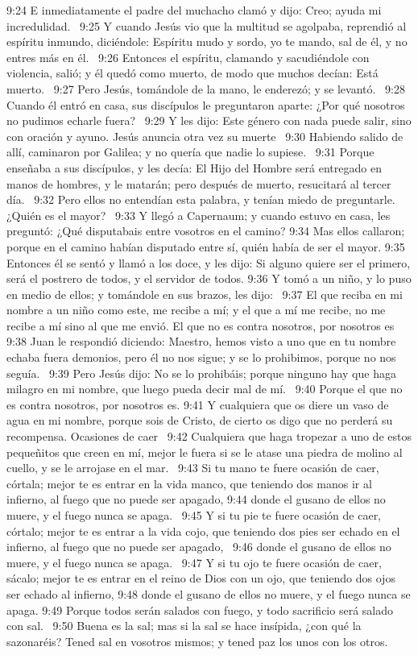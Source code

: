 9:24 E inmediatamente el padre del muchacho clamó y dijo: Creo; ayuda mi incredulidad.  
9:25 Y cuando Jesús vio que la multitud se agolpaba, reprendió al espíritu inmundo, diciéndole: Espíritu mudo y sordo, yo te mando, sal de él, y no entres más en él.  
9:26 Entonces el espíritu, clamando y sacudiéndole con violencia, salió; y él quedó como muerto, de modo que muchos decían: Está muerto.  
9:27 Pero Jesús, tomándole de la mano, le enderezó; y se levantó.  
9:28 Cuando él entró en casa, sus discípulos le preguntaron aparte: ¿Por qué nosotros no pudimos echarle fuera?  
9:29 Y les dijo: Este género con nada puede salir, sino con oración y ayuno. 
Jesús anuncia otra vez su muerte   
9:30 Habiendo salido de allí, caminaron por Galilea; y no quería que nadie lo supiese.  
9:31 Porque enseñaba a sus discípulos, y les decía: El Hijo del Hombre será entregado en manos de hombres, y le matarán; pero después de muerto, resucitará al tercer día.  
9:32 Pero ellos no entendían esta palabra, y tenían miedo de preguntarle.  
¿Quién es el mayor?   
9:33 Y llegó a Capernaum; y cuando estuvo en casa, les preguntó: ¿Qué disputabais entre vosotros en el camino? 
9:34 Mas ellos callaron; porque en el camino habían disputado entre sí, quién había de ser el mayor. 
9:35 Entonces él se sentó y llamó a los doce, y les dijo: Si alguno quiere ser el primero, será el postrero de todos, y el servidor de todos. 
9:36 Y tomó a un niño, y lo puso en medio de ellos; y tomándole en sus brazos, les dijo:  
9:37 El que reciba en mi nombre a un niño como este, me recibe a mí; y el que a mí me recibe, no me recibe a mí sino al que me envió. 
El que no es contra nosotros, por nosotros es   
9:38 Juan le respondió diciendo: Maestro, hemos visto a uno que en tu nombre echaba fuera demonios, pero él no nos sigue; y se lo prohibimos, porque no nos seguía.  
9:39 Pero Jesús dijo: No se lo prohibáis; porque ninguno hay que haga milagro en mi nombre, que luego pueda decir mal de mí.  
9:40 Porque el que no es contra nosotros, por nosotros es. 
9:41 Y cualquiera que os diere un vaso de agua en mi nombre, porque sois de Cristo, de cierto os digo que no perderá su recompensa. 
Ocasiones de caer   
9:42 Cualquiera que haga tropezar a uno de estos pequeñitos que creen en mí, mejor le fuera si se le atase una piedra de molino al cuello, y se le arrojase en el mar.  
9:43 Si tu mano te fuere ocasión de caer, córtala; mejor te es entrar en la vida manco, que teniendo dos manos ir al infierno, al fuego que no puede ser apagado, 
9:44 donde el gusano de ellos no muere, y el fuego nunca se apaga.  
9:45 Y si tu pie te fuere ocasión de caer, córtalo; mejor te es entrar a la vida cojo, que teniendo dos pies ser echado en el infierno, al fuego que no puede ser apagado,  
9:46 donde el gusano de ellos no muere, y el fuego nunca se apaga.  
9:47 Y si tu ojo te fuere ocasión de caer, sácalo; mejor te es entrar en el reino de Dios con un ojo, que teniendo dos ojos ser echado al infierno, 
9:48 donde el gusano de ellos no muere, y el fuego nunca se apaga. 
9:49 Porque todos serán salados con fuego, y todo sacrificio será salado con sal.  
9:50 Buena es la sal; mas si la sal se hace insípida, ¿con qué la sazonaréis? Tened sal en vosotros mismos; y tened paz los unos con los otros. 
